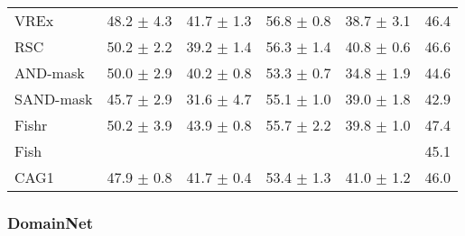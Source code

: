 \documentclass{article}
\begin{document}
\begin{center}
{\begin{tabular}{lccccc}
VREx                 & 48.2 $\pm$ 4.3       & 41.7 $\pm$ 1.3       & 56.8 $\pm$ 0.8       & 38.7 $\pm$ 3.1       & 46.4                 \\
RSC                  & 50.2 $\pm$ 2.2       & 39.2 $\pm$ 1.4       & 56.3 $\pm$ 1.4       & 40.8 $\pm$ 0.6       & 46.6                 \\
AND-mask             & 50.0 $\pm$ 2.9       & 40.2 $\pm$ 0.8       & 53.3 $\pm$ 0.7       & 34.8 $\pm$ 1.9       & 44.6                 \\
SAND-mask            & 45.7 $\pm$ 2.9       & 31.6 $\pm$ 4.7       & 55.1 $\pm$ 1.0       & 39.0 $\pm$ 1.8       & 42.9                 \\
Fishr                & 50.2 $\pm$ 3.9       & 43.9 $\pm$ 0.8       & 55.7 $\pm$ 2.2       & 39.8 $\pm$ 1.0       & 47.4                 \\
Fish                 &                      &                      &                      &                      & 45.1                 \\
\midrule
CAG1                 & 47.9 $\pm$ 0.8       & 41.7 $\pm$ 0.4       & 53.4 $\pm$ 1.3       & 41.0 $\pm$ 1.2       & 46.0                 \\
\bottomrule
\end{tabular}}
\end{center}

\subsubsection{DomainNet}
\end{document}
